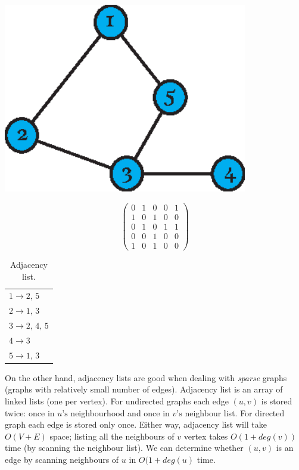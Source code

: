     \begin{table}[H]
        \centering
        \begin{minipage}[b]{0.3\textwidth}
          \centering
          \includegraphics[width=0.8\textwidth]{chapters/02_problem_definition/adjacency}
        \end{minipage}
        \quad
        \begin{minipage}[b]{0.33\textwidth}
          $$\begin{pmatrix}
            0 & 1 & 0 & 0 & 1 \\
            1 & 0 & 1 & 0 & 0 \\
            0 & 1 & 0 & 1 & 1 \\
            0 & 0 & 1 & 0 & 0 \\
            1 & 0 & 1 & 0 & 0
          \end{pmatrix}$$
        \end{minipage}
        \qquad
        \begin{minipage}[b]{0.27\textwidth}
          \begin{tabularx}{\textwidth}{L{1}}
            $1 \to 2,\,5$ \\
            $2 \to 1,\,3$ \\
            $3 \to 2,\,4,\,5$ \\
            $4 \to 3$ \\
            $5 \to 1,\,3$
          \end{tabularx}
          \caption{Adjacency list.}
        \end{minipage}
      \end{table}

    On the other hand, adjacency lists are good when dealing with \emph{sparse} graphs (graphs with relatively small number of edges). Adjacency list is an array of linked lists (one per vertex). For undirected graphs each edge $(u, v)$ is stored twice: once in $u\mbox{'s}$ neighbourhood and once in $v\mbox{'s}$ neighbour list. For directed graph each edge is stored only once. Either way, adjacency list will take $O(V+E)$ space; listing all the neighbours of $v$ vertex takes $O(1+deg(v))$ time (by scanning the neighbour list). We can determine whether $(u, v)$ is an edge by scanning neighbours of $u$ in $O(1+deg(u)$ time.

